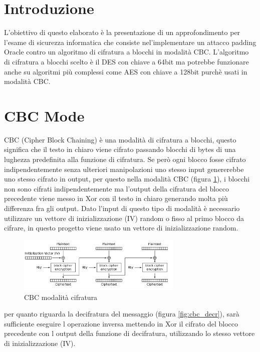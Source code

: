 \section{Introduzione}
L'obiettivo di questo elaborato è la presentazione di un approfondimento per l'esame di sicurezza informatica che consiste nel'implementare 
un attacco padding Oracle contro un algoritmo di cifratura a blocchi in modalità CBC.
L'algoritmo di cifratura a blocchi scelto è il DES con chiave a 64bit ma potrebbe funzionare anche 
su algoritmi più complessi come AES con chiave a 128bit purchè usati in modalità CBC.
\section{CBC Mode}

CBC (Cipher Block Chaining) è una modalità di cifratura a blocchi, questo significa che il testo in chiaro viene cifrato passando blocchi di bytes di una 
lughezza predefinita alla funzione di cifratura. Se però ogni blocco fosse cifrato indipendentemente senza ulteriori manipolazioni uno stesso 
input genererebbe uno stesso cifrato in output, per questo nella modalità CBC (figura \ref{fig:cbc_enc}), i blocchi non sono cifrati indipendentemente ma 
l'output della cifratura del blocco precedente viene messo in Xor con il testo in chiaro generando molta più differenza fra gli output.
Dato l'input di questo tipo di modalità è necessario utilizzare un vettore di inizializzazione (IV) random o fisso al primo blocco da cifrare, in questo progetto viene usato 
un vettore di inizializzazione random.

\begin{figure}[h!]
    \includegraphics[width=0.7\textwidth]{img/CBC_encr.png}
    \centering
    \caption{CBC modalità cifratura}
    \label{fig:cbc_enc}
\end{figure}

per quanto riguarda la decifratura del messaggio (figura \ref{fig:cbc_decr}), sarà sufficiente eseguire l operazione inversa mettendo in Xor il cifrato del blocco precedente con l output della funzione di decifratura, utilizzando lo stesso vettore di inizializzazione (IV).

